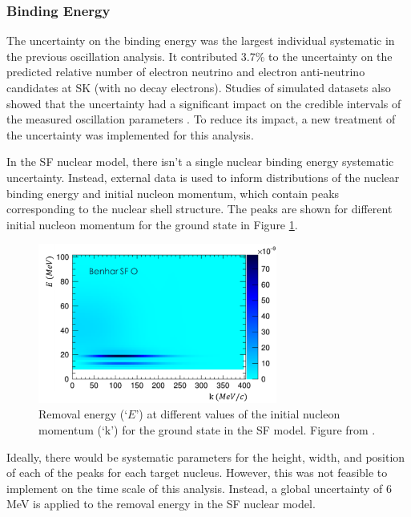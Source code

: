 \subsubsection{Binding Energy}\label{sec:eb}

The uncertainty on the binding energy was the largest individual systematic in the previous oscillation analysis. It contributed 3.7$\%$ to the uncertainty on the predicted relative number of electron neutrino and electron anti-neutrino candidates at SK (with no decay electrons)\cite{t2knature}. Studies of simulated datasets also showed that the uncertainty had a significant impact on the credible intervals of the measured oscillation parameters \cite{tn331}. To reduce its impact, a new treatment of the uncertainty was implemented for this analysis.

In the SF nuclear model, there isn't a single nuclear binding energy systematic uncertainty. Instead, external data is used to inform distributions of the nuclear binding energy and initial nucleon momentum, which contain peaks corresponding to the nuclear shell structure. The peaks are shown for different initial nucleon momentum for the ground state in Figure \ref{fig:sfshells}.

\begin{figure}[!htbp]
\centering
\includegraphics*[width=0.7\textwidth,clip]{figs/SFShells}
\caption{Removal energy (`$E$') at different values of the initial nucleon momentum (`k') for the ground state in the SF model. Figure from \cite{tn344}.}\label{fig:sfshells}
\end{figure}

Ideally, there would be systematic parameters for the height, width, and position of each of the peaks for each target nucleus. However, this was not feasible to implement on the time scale of this analysis. Instead, a global uncertainty of 6 MeV is applied to the removal energy in the SF nuclear model.

